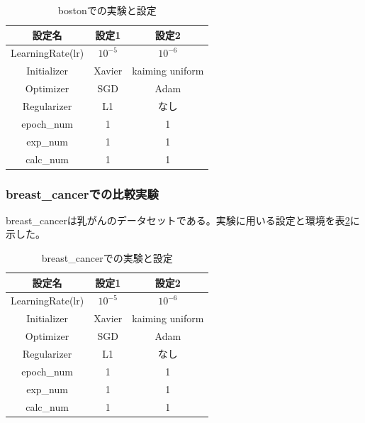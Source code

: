 \begin{table}[htbp]
    \begin{center}
        \caption{bostonでの実験と設定}
        \label{exp:boston}
        \vspace{2mm} 
        \begin{tabular}{ |c|c|c| }
        設定名 & 設定1 & 設定2 \\
        \hline
        LearningRate(lr)         & $ 10^{-5} $ & $ 10^{-6} $ \\
        Initializer       & Xavier & kaiming uniform \\
        Optimizer           & SGD & Adam \\
        Regularizer     & L1 & なし \\
        epoch\_num       & 1 &  1 \\
        exp\_num         & 1 & 1 \\
        calc\_num        & 1 & 1 \\
        \end{tabular}
    \end{center}
\end{table}


\subsubsection{breast\_cancerでの比較実験}
\label{impl:breastcancer}

breast\_cancerは乳がんのデータセットである。実験に用いる設定と環境を表\ref{exp:breastcancer}に示した。

\begin{table}[htbp]
    \begin{center}
        \caption{breast\_cancerでの実験と設定}
        \label{exp:breastcancer}
        \vspace{2mm} 
        \begin{tabular}{ |c|c|c| }
        設定名 & 設定1 & 設定2 \\
        \hline
        LearningRate(lr)         & $ 10^{-5} $ & $ 10^{-6} $ \\
        Initializer       & Xavier & kaiming uniform \\
        Optimizer           & SGD & Adam \\
        Regularizer     & L1 & なし \\
        epoch\_num       & 1 &  1 \\
        exp\_num         & 1 & 1 \\
        calc\_num        & 1 & 1 \\
        \end{tabular}
    \end{center}
\end{table}


